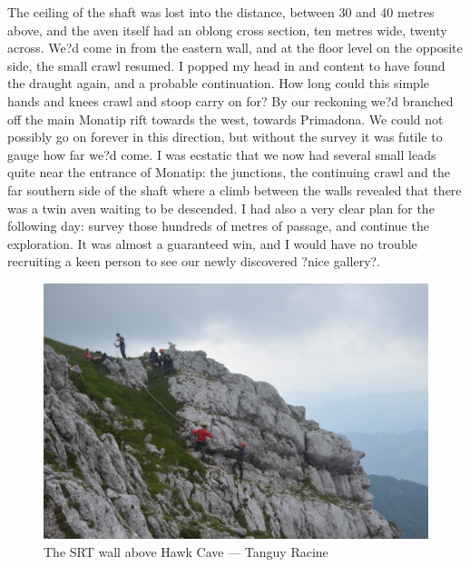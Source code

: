 \documentclass[onecolumn]{book}
\begin{document}
The ceiling of the shaft was lost into the distance, between 30 and 40 metres above, and the aven itself had an oblong cross section, ten metres wide, twenty across. We?d come in from the eastern wall, and at the floor level on the opposite side, the small crawl resumed. I popped my head in and content to have found the draught again, and a probable continuation. How long could this simple hands and knees crawl and stoop carry on for? By our reckoning we?d branched off the main Monatip rift towards the west, towards Primadona. We could not possibly go on forever in this direction, but without the survey it was futile to gauge how far we?d come.  I was ecstatic that we now had several small leads quite near the entrance of Monatip: the junctions, the continuing crawl and the far southern side of the shaft where a climb between the walls revealed that there was a twin aven waiting to be descended. I had also a very clear plan for the following day: survey those hundreds of metres of passage, and continue the exploration. It was almost a guaranteed win, and I would have no trouble recruiting a keen person to see our newly discovered ?nice gallery?.








\begin{figure}[h]
\centering
\includegraphics[width=\textwidth]{The cliff abseil.jpg}
\caption{The SRT wall above Hawk Cave --- Tanguy Racine}
\label{SRTwall}
\end{figure}
\end{document}
